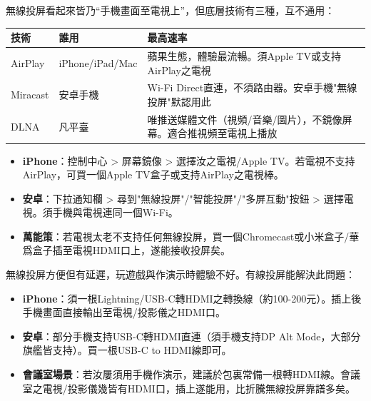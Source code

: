 


無線投屏看起來皆乃“手機畫面至電視上”，但底層技術有三種，互不通用：

\begin{center}
\begin{tabularx}{\linewidth}{|X|X|X|}
\hline
\textbf{技術} & \textbf{誰用} & \textbf{最高速率} \tabularnewline
\hline
AirPlay & iPhone/iPad/Mac & 蘋果生態，體驗最流暢。須Apple TV或支持AirPlay之電視 \tabularnewline
Miracast & 安卓手機 & Wi-Fi Direct直連，不須路由器。安卓手機"無線投屏"默認用此 \tabularnewline
DLNA & 凡平臺 & 唯推送媒體文件（視頻/音樂/圖片），不鏡像屏幕。適合推視頻至電視上播放 \tabularnewline
\hline
\end{tabularx}
\end{center}


\begin{itemize}
  \item \textbf{iPhone}：控制中心 > 屏幕鏡像 > 選擇汝之電視/Apple TV。若電視不支持AirPlay，可買一個Apple TV盒子或支持AirPlay之電視棒。
  \item \textbf{安卓}：下拉通知欄 > 尋到"無線投屏"/"智能投屏"/"多屏互動"按鈕 > 選擇電視。須手機與電視連同一個Wi-Fi。
  \item \textbf{萬能策}：若電視太老不支持任何無線投屏，買一個Chromecast或小米盒子/華爲盒子插至電視HDMI口上，遂能接收投屏矣。
\end{itemize}


無線投屏方便但有延遲，玩遊戲與作演示時體驗不好。有線投屏能解決此問題：

\begin{itemize}
  \item \textbf{iPhone}：須一根Lightning/USB-C轉HDMI之轉換線（約100-200元）。插上後手機畫面直接輸出至電視/投影儀之HDMI口。
  \item \textbf{安卓}：部分手機支持USB-C轉HDMI直連（須手機支持DP Alt Mode，大部分旗艦皆支持）。買一根USB-C to HDMI線即可。
  \item \textbf{會議室場景}：若汝屢須用手機作演示，建議於包裏常備一根轉HDMI線。會議室之電視/投影儀幾皆有HDMI口，插上遂能用，比折騰無線投屏靠譜多矣。
\end{itemize}

